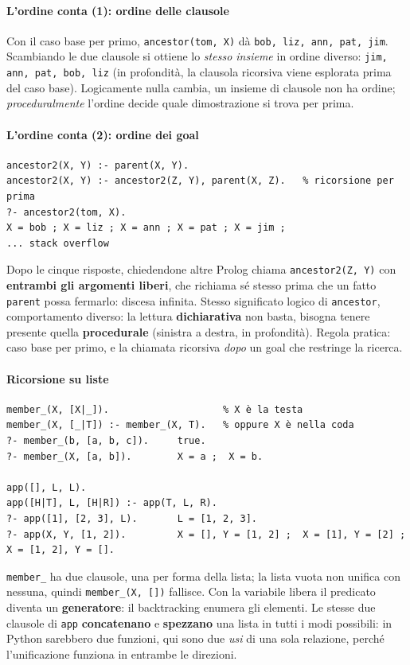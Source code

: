 \documentclass[a4paper,12pt]{article}
\begin{document}
\paragraph{L'ordine conta (1): ordine delle clausole} Con il caso base per primo,
\texttt{ancestor(tom, X)} dà \texttt{bob, liz, ann, pat, jim}. Scambiando le due clausole si
ottiene lo \emph{stesso insieme} in ordine diverso: \texttt{jim, ann, pat, bob, liz} (in
profondità, la clausola ricorsiva viene esplorata prima del caso base). Logicamente nulla cambia,
un insieme di clausole non ha ordine; \emph{proceduralmente} l'ordine decide quale dimostrazione
si trova per prima.

\paragraph{L'ordine conta (2): ordine dei goal}
\begin{verbatim}
ancestor2(X, Y) :- parent(X, Y).
ancestor2(X, Y) :- ancestor2(Z, Y), parent(X, Z).   % ricorsione per prima
?- ancestor2(tom, X).
X = bob ; X = liz ; X = ann ; X = pat ; X = jim ;
... stack overflow
\end{verbatim}
Dopo le cinque risposte, chiedendone altre Prolog chiama \texttt{ancestor2(Z, Y)} con
\textbf{entrambi gli argomenti liberi}, che richiama sé stesso prima che un fatto
\texttt{parent} possa fermarlo: discesa infinita. Stesso significato logico di
\texttt{ancestor}, comportamento diverso: la lettura \textbf{dichiarativa} non basta, bisogna
tenere presente quella \textbf{procedurale} (sinistra a destra, in profondità). Regola pratica:
caso base per primo, e la chiamata ricorsiva \emph{dopo} un goal che restringe la ricerca.

\paragraph{Ricorsione su liste}
\begin{verbatim}
member_(X, [X|_]).                    % X è la testa
member_(X, [_|T]) :- member_(X, T).   % oppure X è nella coda
?- member_(b, [a, b, c]).     true.
?- member_(X, [a, b]).        X = a ;  X = b.

app([], L, L).
app([H|T], L, [H|R]) :- app(T, L, R).
?- app([1], [2, 3], L).       L = [1, 2, 3].
?- app(X, Y, [1, 2]).         X = [], Y = [1, 2] ;  X = [1], Y = [2] ;  X = [1, 2], Y = [].
\end{verbatim}
\texttt{member\_} ha due clausole, una per forma della lista; la lista vuota non unifica con
nessuna, quindi \texttt{member\_(X, [])} fallisce. Con la variabile libera il predicato diventa un
\textbf{generatore}: il backtracking enumera gli elementi. Le stesse due clausole di
\texttt{app} \textbf{concatenano} e \textbf{spezzano} una lista in tutti i modi possibili: in Python
sarebbero due funzioni, qui sono due \emph{usi} di una sola relazione, perché l'unificazione
funziona in entrambe le direzioni.
\end{document}
